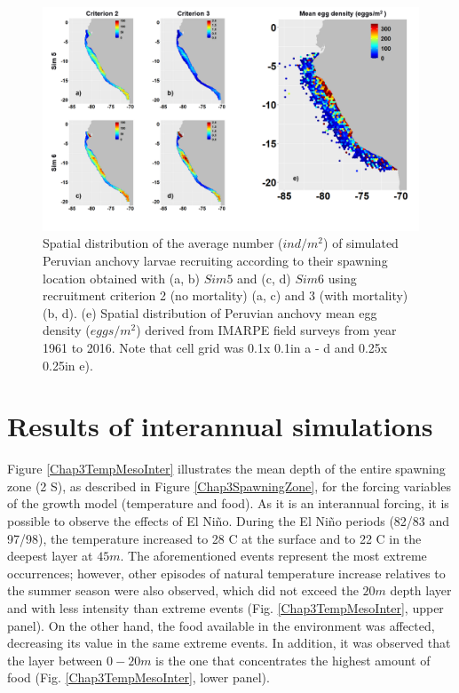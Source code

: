 \begin{figure}[t]
	\includegraphics[width=1.0\textwidth]{figures/Chap3DistPartiMapEgg.png}
	\centering
	\caption{Spatial distribution of the average number ($ind/m^2$) of simulated Peruvian anchovy larvae recruiting according to their spawning location obtained with (a, b) $Sim 5$ and (c, d) $Sim 6$ using recruitment criterion 2 (no mortality) (a, c) and 3 (with mortality) (b, d). (e) Spatial distribution of Peruvian anchovy mean egg density ($eggs/m^2$) derived from IMARPE field surveys from year 1961 to 2016. Note that cell grid was 0.1\textdegree x 0.1\textdegree in a - d and 0.25\textdegree x 0.25\textdegree in e).}
	\label{Chap3DistPartiMapEgg}
\end{figure}

\clearpage
\section{Results of interannual simulations}\label{Chap3Resu2}

Figure \ref{Chap3TempMesoInter} illustrates the mean depth of the entire spawning zone (2  \textdegree S), as described in Figure \ref{Chap3SpawningZone}, for the forcing variables of the growth model (temperature and food). As it is an interannual forcing, it is possible to observe the effects of El Niño. During the El Niño periods (82/83 and 97/98), the temperature increased to 28 \textdegree C at the surface and to 22 \textdegree C in the deepest layer at $45 m$. The aforementioned events represent the most extreme occurrences; however, other episodes of natural temperature increase relatives to the summer season were also observed, which did not exceed the $20 m$ depth layer and with less intensity than extreme events (Fig. \ref{Chap3TempMesoInter}, upper panel). On the other hand, the food available in the environment was affected, decreasing its value in the same extreme events. In addition, it was observed that the layer between $0-20m$ is the one that concentrates the highest amount of food (Fig. \ref{Chap3TempMesoInter}, lower panel).\\


